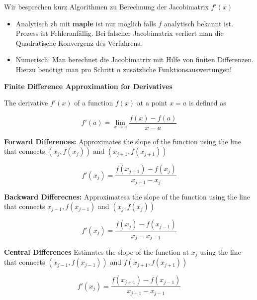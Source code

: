 \documentclass{report}
\begin{document}
Wir besprechen kurz Algorithmen zu Berechnung der Jacobimatrix $f'(x)$

 \begin{itemize}
  \item Analytisch zb mit \textbf{maple} ist nur möglich falls $f$ analytisch bekannt ist. Prozess ist Fehleranfällig. Bei falscher Jacobimatrix verliert man die Quadratische Konvergenz des Verfahrens.
      \item Numerisch: Man berechnet die Jacobimatrix mit Hilfe von finiten Differenzen. Hierzu benötigt man pro Schritt $n$ zusätzliche Funktionsauswertungen!
\end{itemize}

\textbf{Finite Difference Approximation for Derivatives}

The derivative $f'(x)$ of a function $f(x)$ at a point $x =a$ is defined as

\begin{equation}
    f'(a) =  \lim_{x \to a} \frac{f(x) - f(a)}{x-a}
\end{equation}

\textbf{Forward Differences:} Approximates the slope of the function using the line that connects $(x_j, f(x_j))$ and $(x_{j+1},f(x_{j+1}))$

 \begin{equation}
     f'(x_j) = \frac{f(x_{j+1}) - f(x_j)}{x_{j+1} - x_j}
\end{equation}

\textbf{Backward Differecnes:} Approximatesa the slope of the function using the line that connects $x_{j-1},f(x_{j-1})$ and $(x_j, f(x_{j}))$

 \begin{equation}
     f'(x_j) = \frac{f(x_j) - f(x_{j-1})}{x_j - x_{j-1}}
\end{equation}

\textbf{Central Differences} Estimates the slope of the function at $x_j$ using the line that connects $(x_{j-1}, f(x_{j-1}))$ and  $f(x_{j+1},f(x_{j+1}))$

 \begin{equation}
     f'(x_j) = \frac{f(x_{j+1})-f(x_{j-1})}{x_{j+1}-x_{j-1}}
\end{equation}

\end{document}
